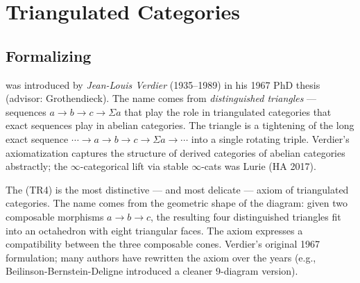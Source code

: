 \section{Triangulated Categories}
\label{sec:triangulated}

\subsection{Formalizing}

\begin{nameorigin}
 was introduced by \emph{Jean-Louis Verdier}
(1935--1989) in his 1967 PhD thesis (advisor: Grothendieck). The name
comes from \emph{distinguished triangles} — sequences $a \to b \to c
\to \Sigma a$ that play the role in triangulated categories that exact
sequences play in abelian categories. The triangle is a tightening of
the long exact sequence $\cdots \to a \to b \to c \to \Sigma a \to \cdots$
into a single rotating triple. Verdier's axiomatization captures the
structure of derived categories of abelian categories abstractly; the
$\infty$-categorical lift via stable $\infty$-cats was Lurie (HA 2017).
\end{nameorigin}

\begin{nameorigin}
The  (TR4) is the most distinctive — and most
delicate — axiom of triangulated categories. The name comes from the
geometric shape of the diagram: given two composable morphisms $a \to b \to c$,
the resulting four distinguished triangles fit into an octahedron with
eight triangular faces. The axiom expresses a compatibility between the
three composable cones. Verdier's original 1967 formulation; many
authors have rewritten the axiom over the years (e.g., Beilinson-Bernstein-Deligne
introduced a cleaner $9$-diagram version).
\end{nameorigin}

